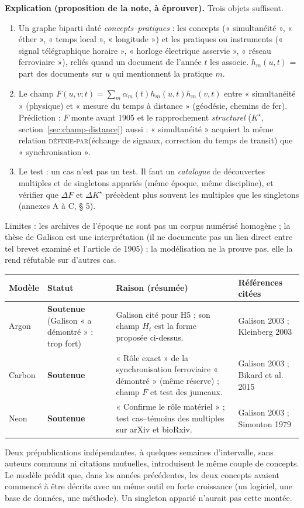 \documentclass[a4paper,11pt]{article}
\makeatletter
\newenvironment{avis}{\small\renewcommand{\arraystretch}{1.15}%
\begin{longtable}{@{}>{\raggedright\arraybackslash}p{1.35cm}>{\raggedright\arraybackslash}p{2.45cm}>{\raggedright\arraybackslash}p{7.15cm}>{\raggedright\arraybackslash}p{4.4cm}@{}}
\toprule \textbf{Modèle} & \textbf{Statut} & \textbf{Raison (résumée)} & \textbf{Références citées}\\ \midrule \endhead
\bottomrule \endfoot}{\end{longtable}}
\newcommand{\st}[1]{\textbf{#1}}
\makeatother
\begin{document}
\textbf{Explication (proposition de la note, à éprouver).} Trois objets suffisent.
\begin{enumerate}[itemsep=1pt]
\item Un graphe biparti daté \emph{concepts–pratiques} : les concepts (« simultanéité », « éther », « temps local », « longitude ») et les pratiques ou instruments (« signal télégraphique horaire », « horloge électrique asservie », « réseau ferroviaire »), reliés quand un document de l'année $t$ les associe. $h_m(u,t)$ = part des documents sur $u$ qui mentionnent la pratique $m$.
\item Le champ $F(u,v;t)=\sum_m\alpha_m(t)h_m(u,t)h_m(v,t)$ entre « simultanéité » (physique) et « mesure du temps à distance » (géodésie, chemins de fer). Prédiction : $F$ monte avant 1905 et le rapprochement \emph{structurel} ($K^\star$, section~\ref{sec:champ-distance}) aussi : « simultanéité » acquiert la même relation \textsc{définie-par}(échange de signaux, correction du temps de transit) que « synchronisation ».
\item Le test : un cas n'est pas un test. Il faut un \emph{catalogue} de découvertes multiples et de singletons appariés (même époque, même discipline), et vérifier que $\Delta F$ et $\Delta K^\star$ précèdent plus souvent les multiples que les singletons (annexes A à C, § 5).
\end{enumerate}
Limites : les archives de l'époque ne sont pas un corpus numérisé homogène ; la thèse de Galison est une interprétation (il ne documente pas un lien direct entre tel brevet examiné et l'article de 1905) ; la modélisation ne la prouve pas, elle la rend réfutable sur d'autres cas.

\begin{avis}
Argon & \st{Soutenue} (Galison « a démontré » : trop fort) & Galison cité pour H5 ; son champ $H_t$ est la forme proposée ci-dessus. & Galison 2003 ; Kleinberg 2003\\ \midrule
Carbon & \st{Soutenue} & « Rôle exact » de la synchronisation ferroviaire « démontré » (même réserve) ; champ $F$ et test des jumeaux. & Galison 2003 ; Bikard et al. 2015\\ \midrule
Neon & \st{Soutenue} & « Confirme le rôle matériel » ; test cas–témoins des multiples sur arXiv et bioRxiv. & Galison 2003 ; Simonton 1979\\
\end{avis}

\begin{exemple}
Deux prépublications indépendantes, à quelques semaines d'intervalle, sans auteurs communs ni citations mutuelles, introduisent le même couple de concepts. Le modèle prédit que, dans les années précédentes, les deux concepts avaient commencé à être décrits avec un même outil en forte croissance (un logiciel, une base de données, une méthode). Un singleton apparié n'aurait pas cette montée.
\end{exemple}
\end{document}
